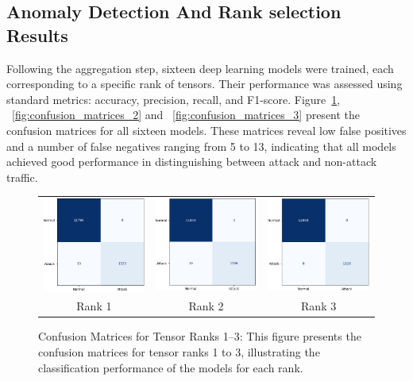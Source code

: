 \documentclass[preprint,12pt,authoryear]{elsarticle}
\begin{document}
\subsection{Anomaly Detection And Rank selection Results}
 Following the aggregation step, sixteen deep learning models were trained, each corresponding to a specific rank of tensors. Their performance was assessed using standard metrics: accuracy, precision, recall, and F1-score. Figure~\ref{fig:confusion_matrices_1}, ~\ref{fig:confusion_matrices_2} and ~\ref{fig:confusion_matrices_3} present the confusion matrices for all sixteen models. These matrices reveal low false positives and a number of false negatives ranging from 5 to 13, indicating that all models achieved good performance in distinguishing between attack and non-attack traffic.

\begin{figure}[H]
    \centering
    \begin{tabular}{ccc}
        \includegraphics[width=0.3\linewidth]{rank_1.png} &
        \includegraphics[width=0.3\linewidth]{rank_2.png} &
        \includegraphics[width=0.3\linewidth]{rank_3.png} \\
        \small Rank 1 & \small Rank 2 & \small Rank 3 \\[6pt]
    \end{tabular}
    \caption{Confusion Matrices for Tensor Ranks 1–3: This figure presents the confusion matrices for tensor ranks 1 to 3, illustrating the classification performance of the models for each rank.}
    \label{fig:confusion_matrices_1}
\end{figure}
\end{document}
